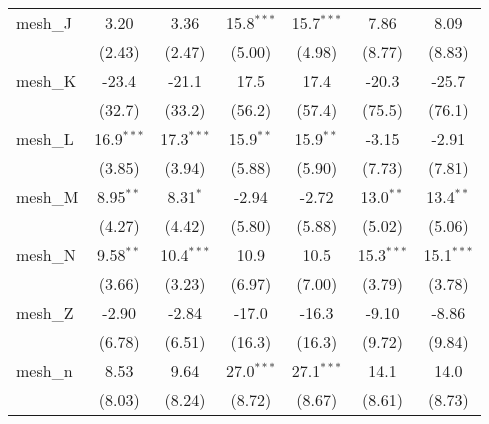 \begin{tabular}{lcccccc}
   mesh\_J                                                     & 3.20          & 3.36          & 15.8$^{***}$  & 15.7$^{***}$  & 7.86          & 8.09\\   
                                                               & (2.43)        & (2.47)        & (5.00)        & (4.98)        & (8.77)        & (8.83)\\   
   mesh\_K                                                     & -23.4         & -21.1         & 17.5          & 17.4          & -20.3         & -25.7\\   
                                                               & (32.7)        & (33.2)        & (56.2)        & (57.4)        & (75.5)        & (76.1)\\   
   mesh\_L                                                     & 16.9$^{***}$  & 17.3$^{***}$  & 15.9$^{**}$   & 15.9$^{**}$   & -3.15         & -2.91\\   
                                                               & (3.85)        & (3.94)        & (5.88)        & (5.90)        & (7.73)        & (7.81)\\   
   mesh\_M                                                     & 8.95$^{**}$   & 8.31$^{*}$    & -2.94         & -2.72         & 13.0$^{**}$   & 13.4$^{**}$\\   
                                                               & (4.27)        & (4.42)        & (5.80)        & (5.88)        & (5.02)        & (5.06)\\   
   mesh\_N                                                     & 9.58$^{**}$   & 10.4$^{***}$  & 10.9          & 10.5          & 15.3$^{***}$  & 15.1$^{***}$\\   
                                                               & (3.66)        & (3.23)        & (6.97)        & (7.00)        & (3.79)        & (3.78)\\   
   mesh\_Z                                                     & -2.90         & -2.84         & -17.0         & -16.3         & -9.10         & -8.86\\   
                                                               & (6.78)        & (6.51)        & (16.3)        & (16.3)        & (9.72)        & (9.84)\\   
   mesh\_n                                                     & 8.53          & 9.64          & 27.0$^{***}$  & 27.1$^{***}$  & 14.1          & 14.0\\   
                                                               & (8.03)        & (8.24)        & (8.72)        & (8.67)        & (8.61)        & (8.73)\\   

\end{tabular}
